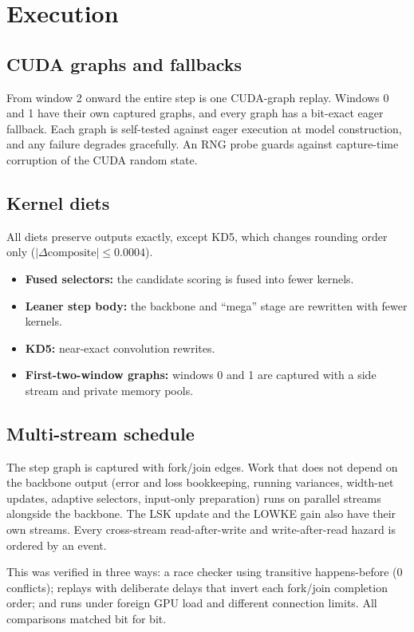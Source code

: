 \documentclass[10pt]{article}
\begin{document}
\section{Execution}

\subsection{CUDA graphs and fallbacks}
From window 2 onward the entire step is one CUDA-graph replay. Windows 0 and 1 have their own captured graphs,
and every graph has a bit-exact eager fallback. Each graph is self-tested against eager execution at model
construction, and any failure degrades gracefully. An RNG probe guards against capture-time corruption of the
CUDA random state.

\subsection{Kernel diets}
All diets preserve outputs exactly, except KD5, which changes rounding order only
($|\Delta\text{composite}|\le0.0004$).
\begin{itemize}
\item \textbf{Fused selectors:} the candidate scoring is fused into fewer kernels.
\item \textbf{Leaner step body:} the backbone and ``mega'' stage are rewritten with fewer kernels.
\item \textbf{KD5:} near-exact convolution rewrites.
\item \textbf{First-two-window graphs:} windows 0 and 1 are captured with a side stream and private memory pools.
\end{itemize}

\subsection{Multi-stream schedule}
The step graph is captured with fork/join edges. Work that does not depend on the backbone output (error and
loss bookkeeping, running variances, width-net updates, adaptive selectors, input-only preparation) runs on
parallel streams alongside the backbone. The LSK update and the LOWKE gain also have their own streams. Every
cross-stream read-after-write and write-after-read hazard is ordered by an event.

This was verified in three ways: a race checker using transitive happens-before (0 conflicts); replays with
deliberate delays that invert each fork/join completion order; and runs under foreign GPU load and different
connection limits. All comparisons matched bit for bit.
\end{document}
